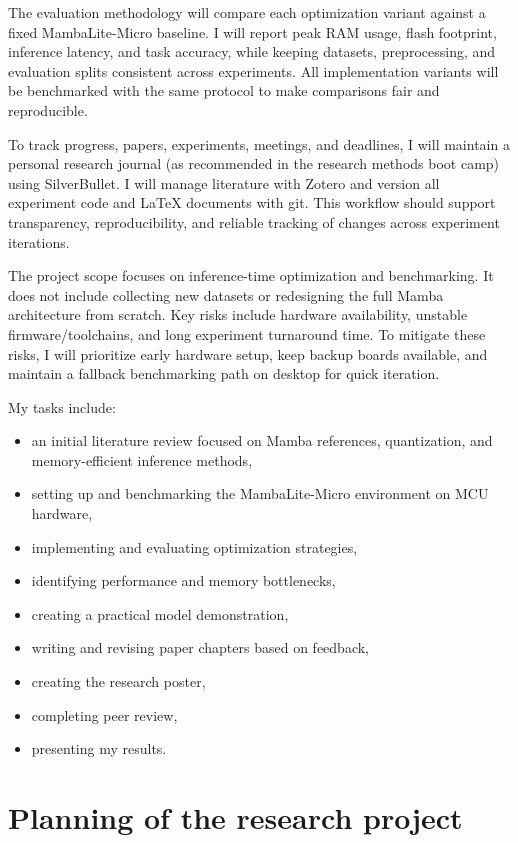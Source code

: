 \documentclass[english, a4paper]{article}
\begin{document}
The evaluation methodology will compare each optimization variant against a fixed MambaLite-Micro baseline. I will report peak RAM usage, flash footprint, inference latency, and task accuracy, while keeping datasets, preprocessing, and evaluation splits consistent across experiments. All implementation variants will be benchmarked with the same protocol to make comparisons fair and reproducible.

To track progress, papers, experiments, meetings, and deadlines, I will maintain a personal research journal (as recommended in the research methods boot camp) using SilverBullet. I will manage literature with Zotero and version all experiment code and LaTeX documents with git. This workflow should support transparency, reproducibility, and reliable tracking of changes across experiment iterations.

The project scope focuses on inference-time optimization and benchmarking. It does not include collecting new datasets or redesigning the full Mamba architecture from scratch. Key risks include hardware availability, unstable firmware/toolchains, and long experiment turnaround time. To mitigate these risks, I will prioritize early hardware setup, keep backup boards available, and maintain a fallback benchmarking path on desktop for quick iteration.

My tasks include:
\begin{itemize}
    \item an initial literature review focused on Mamba references, quantization, and memory-efficient inference methods,
    \item setting up and benchmarking the MambaLite-Micro environment on MCU hardware,
    \item implementing and evaluating optimization strategies,
    \item identifying performance and memory bottlenecks,
    \item creating a practical model demonstration,
    \item writing and revising paper chapters based on feedback,
    \item creating the research poster,
    \item completing peer review,
    \item presenting my results.
\end{itemize}

\section*{Planning of the research project}
\end{document}
